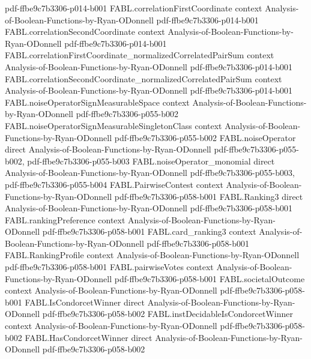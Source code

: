 \begin{theorem}
  {pdf-ffbe9c7b3306-p014-b001}
\proofstep
  {FABL.correlationFirstCoordinate}
  {context}
  {Analysis-of-Boolean-Functions-by-Ryan-ODonnell}
  {pdf-ffbe9c7b3306-p014-b001}
\proofstep
  {FABL.correlationSecondCoordinate}
  {context}
  {Analysis-of-Boolean-Functions-by-Ryan-ODonnell}
  {pdf-ffbe9c7b3306-p014-b001}
\proofstep
  {FABL.correlationFirstCoordinate_normalizedCorrelatedPairSum}
  {context}
  {Analysis-of-Boolean-Functions-by-Ryan-ODonnell}
  {pdf-ffbe9c7b3306-p014-b001}
\proofstep
  {FABL.correlationSecondCoordinate_normalizedCorrelatedPairSum}
  {context}
  {Analysis-of-Boolean-Functions-by-Ryan-ODonnell}
  {pdf-ffbe9c7b3306-p014-b001}
\proofstep
  {FABL.noiseOperatorSignMeasurableSpace}
  {context}
  {Analysis-of-Boolean-Functions-by-Ryan-ODonnell}
  {pdf-ffbe9c7b3306-p055-b002}
\proofstep
  {FABL.noiseOperatorSignMeasurableSingletonClass}
  {context}
  {Analysis-of-Boolean-Functions-by-Ryan-ODonnell}
  {pdf-ffbe9c7b3306-p055-b002}
\proofstep
  {FABL.noiseOperator}
  {direct}
  {Analysis-of-Boolean-Functions-by-Ryan-ODonnell}
  {pdf-ffbe9c7b3306-p055-b002,
    pdf-ffbe9c7b3306-p055-b003}
\proofstep
  {FABL.noiseOperator_monomial}
  {direct}
  {Analysis-of-Boolean-Functions-by-Ryan-ODonnell}
  {pdf-ffbe9c7b3306-p055-b003,
    pdf-ffbe9c7b3306-p055-b004}
\proofstep
  {FABL.PairwiseContest}
  {context}
  {Analysis-of-Boolean-Functions-by-Ryan-ODonnell}
  {pdf-ffbe9c7b3306-p058-b001}
\proofstep
  {FABL.Ranking3}
  {direct}
  {Analysis-of-Boolean-Functions-by-Ryan-ODonnell}
  {pdf-ffbe9c7b3306-p058-b001}
\proofstep
  {FABL.rankingPreference}
  {context}
  {Analysis-of-Boolean-Functions-by-Ryan-ODonnell}
  {pdf-ffbe9c7b3306-p058-b001}
\proofstep
  {FABL.card_ranking3}
  {context}
  {Analysis-of-Boolean-Functions-by-Ryan-ODonnell}
  {pdf-ffbe9c7b3306-p058-b001}
\proofstep
  {FABL.RankingProfile}
  {context}
  {Analysis-of-Boolean-Functions-by-Ryan-ODonnell}
  {pdf-ffbe9c7b3306-p058-b001}
\proofstep
  {FABL.pairwiseVotes}
  {context}
  {Analysis-of-Boolean-Functions-by-Ryan-ODonnell}
  {pdf-ffbe9c7b3306-p058-b001}
\proofstep
  {FABL.societalOutcome}
  {context}
  {Analysis-of-Boolean-Functions-by-Ryan-ODonnell}
  {pdf-ffbe9c7b3306-p058-b001}
\proofstep
  {FABL.IsCondorcetWinner}
  {direct}
  {Analysis-of-Boolean-Functions-by-Ryan-ODonnell}
  {pdf-ffbe9c7b3306-p058-b002}
\proofstep
  {FABL.instDecidableIsCondorcetWinner}
  {context}
  {Analysis-of-Boolean-Functions-by-Ryan-ODonnell}
  {pdf-ffbe9c7b3306-p058-b002}
\proofstep
  {FABL.HasCondorcetWinner}
  {direct}
  {Analysis-of-Boolean-Functions-by-Ryan-ODonnell}
  {pdf-ffbe9c7b3306-p058-b002}
\proofstep

\end{theorem}
